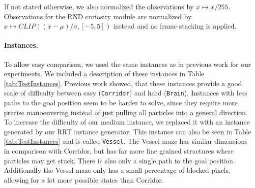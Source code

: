 If not stated otherwise, we also normalized the observations by $x \mapsto x/255$. Observations for the RND curiosity module are normalized by $x \mapsto CLIP((x-\mu)/\sigma, [-5, 5])$ instead and no frame stacking is applied.


\paragraph{Instances.}
To allow easy comparison, we used the same instances as in previous work for our experiments. We included a description of these instances in Table \ref{tab:TestInstances}. Previous work showed, that these instances provide a good scale of difficulty between easy (\texttt{Corridor}) and hard (\texttt{Brain}). Instances with less paths to the goal position seem to be harder to solve, since they require more precise manoeuvering instead of just pulling all particles into a general direction. To increase the difficulty of our medium instance, we replaced it with an instance generated by our RRT instance generator. This instance can also be seen in Table \ref{tab:TestInstances} and is called \texttt{Vessel}. The Vessel maze has similar dimensions in comparison with Corridor, but has far more fine grained structures where particles may get stuck. There is also only a single path to the goal position. Additionally the Vessel maze only has a small percentage of blocked pixels, allowing for a lot more possible states than Corridor. 

